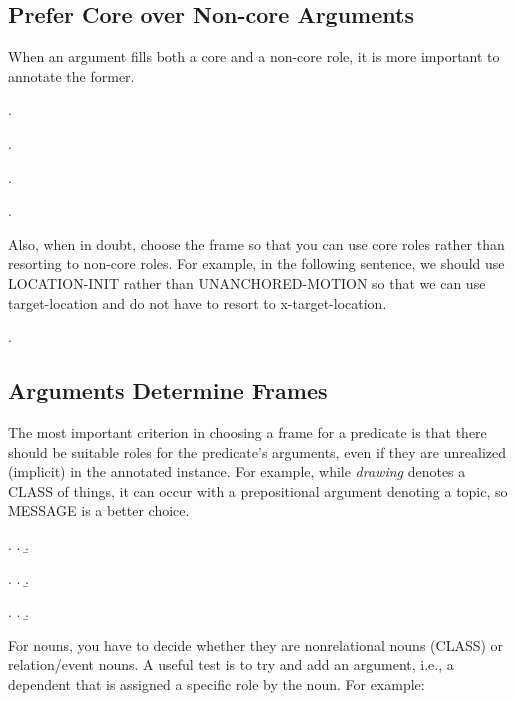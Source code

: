 \documentclass[a4paper]{article}
\newcommand{\fr}[1]{\textsf{#1}}
\newcommand{\rl}[1]{\textsf{#1}}
\begin{document}
\subsection{Prefer Core over Non-core Arguments}

When an argument fills both a core and a non-core role, it is more important to
annotate the former.

\ex.

\ex.

\ex.

\ex.

Also, when in doubt, choose the frame so that you can use core roles rather
than resorting to non-core roles. For example, in the following sentence, we
should use \fr{LOCATION-INIT} rather than \fr{UNANCHORED-MOTION} so that we can
use \rl{target-location} and do not have to resort to \fr{x-target-location}.

\ex.


\newpage\subsection{Arguments Determine Frames}

The most important criterion in choosing a frame for a predicate is that there
should be suitable roles for the predicate's arguments, even if they are
unrealized (implicit) in the annotated instance. For example, while
\emph{drawing} denotes a \fr{CLASS} of things, it can occur with a
prepositional argument denoting a \rl{topic}, so \fr{MESSAGE} is a better
choice.

\ex.
\a.
\b.

\ex.
\a.
\b.

\ex.
\a.
\b.

For nouns, you have to decide whether they are nonrelational nouns (\fr{CLASS})
or relation/event nouns. A useful test is to try and add an argument, i.e., a
dependent that is assigned a specific role by the noun. For example:
\end{document}
